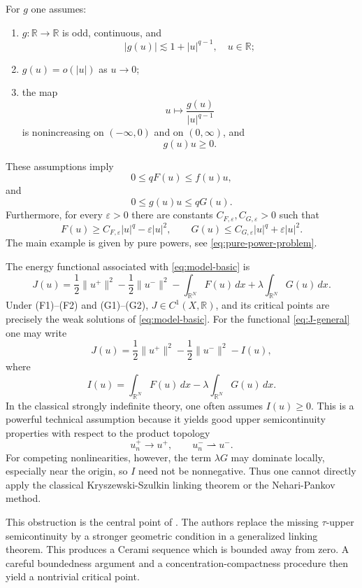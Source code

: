 \documentclass[11pt]{amsart}
\numberwithin{equation}{section}
\theoremstyle{definition}
\newcommand{\R}{\mathbb{R}}
\newcommand{\eps}{\varepsilon}
\newcommand{\weak}{\rightharpoonup}
\begin{document}
For $g$ one assumes:
\begin{enumerate}[label=(G\arabic*)]
\item $g:\R\to\R$ is odd, continuous, and 
\[
|g(u)|\lesssim 1+|u|^{q-1}, \quad u \in \R;
\]
\item $g(u)=o(|u|)$ as $u\to0$;
\item the map
\[
u\mapsto \frac{g(u)}{|u|^{q-1}}
\]
is nonincreasing on $(-\infty,0)$ and on $(0,\infty)$, and
\[
g(u)u\ge0.
\]
\end{enumerate}
These assumptions imply
\begin{equation}
0\le qF(u)\le f(u)u,
\end{equation}
and
\begin{equation}
0\le g(u)u\le qG(u).
\end{equation}
Furthermore, for every $\eps>0$ there are constants
$C_{F,\eps},C_{G,\eps}>0$ such that
\begin{equation}
F(u)\ge C_{F,\eps}|u|^q-\eps |u|^2,
\qquad
G(u)\le C_{G,\eps}|u|^q+\eps |u|^2.
\end{equation}
The main example is given by pure powers, see \eqref{eq:pure-power-problem}.

The energy functional associated with \eqref{eq:model-basic} is
\begin{equation}\label{eq:J-general}
J(u)=\frac12\|u^+\|^2-\frac12\|u^-\|^2
-\int_{\R^N}F(u)\,dx+\lambda\int_{\R^N}G(u)\,dx.
\end{equation}
Under (F1)--(F2) and (G1)--(G2), $J\in C^1(X,\R)$, and its critical
points are precisely the weak solutions of \eqref{eq:model-basic}.
For the functional \eqref{eq:J-general} one may write
\[
J(u)=\frac12\|u^+\|^2-\frac12\|u^-\|^2-I(u),
\]
where
\[
I(u)=\int_{\R^N}F(u)\,dx-\lambda\int_{\R^N}G(u)\,dx.
\]
In the classical strongly indefinite theory, one often assumes
$I(u)\ge0$. This is a powerful technical assumption because it yields
good upper semicontinuity properties with respect to the product topology
\[
u_n^+\to u^+,\qquad u_n^-\weak u^-.
\]
For competing nonlinearities, however, the term $\lambda G$ may dominate
locally, especially near the origin, so $I$ need not be nonnegative. Thus
one cannot directly apply the classical Kryszewski-Szulkin linking theorem
or the Nehari-Pankov method.

This obstruction is the central point of \cite{BB2022}. The authors
replace the missing $\tau$-upper semicontinuity by a stronger geometric
condition in a generalized linking theorem. This produces a Cerami
sequence which is bounded away from zero. A careful boundedness argument
and a concentration-compactness procedure then yield a nontrivial critical
point.
\end{document}
